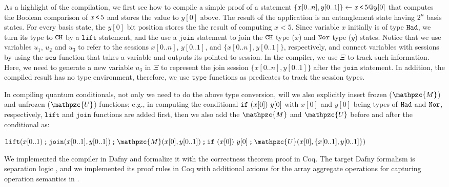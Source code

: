 As a highlight of the compilation, we first see how to compile a simple proof of a statement ${\{x[0..n],y[0..1]\}} \xleftarrow{} {x\,\texttt{<}\,5@y[0]}$ that computes the Boolean comparison of $x\,\texttt{<}\,5$ and stores the value to $y[0]$ above.
The result of the application is an entanglement state having $2^n$ basis states. For every basis state, the $y[0]$ bit position stores the the result of computing $x<5$.
Since variable $x$ initially is of type $\texttt{Had}$, we turn its type to $\texttt{CH}$ by a $\texttt{lift}$ statement, and the use a $\texttt{join}$ statement to join the $\texttt{CH}$ type ($x$) and $\texttt{Nor}$ type ($y$) states.
Notice that we use variables $u_1$, $u_2$ and $u_3$ to refer to the sessions $x[0..n]$, $y[0..1]$, and $\{x[0..n],y[0..1]\}$, respectively, and connect variables with sessions by using the $\texttt{ses}$ function that takes a variable and outputs its pointed-to session. In the \qafny compiler, we use $\Xi$ to track such information. Here, we need to generate a new variable $u_3$ in $\Xi$ to represent the join session $\{x[0..n],y[0..1]\}$ after the $\texttt{join}$ statement. 
In addition, the compiled result has no type environment, therefore, we use $\texttt{type}$ functions as predicates to track the session types.

In compiling quantum conditionals, not only we need to do the above type conversion, will we also explicitly insert frozen ($\mathpzc{M}$) and unfrozen ($\mathpzc{U}$) functions; e.g., in computing the conditional $\texttt{if}~{(x[0])}~{y[0]}$ with $x[0]$ and $y[0]$ being types of $\texttt{Had}$ and $\texttt{Nor}$, respectively, $\texttt{lift}$ and $\texttt{join}$ functions are added first, then we also add the $\mathpzc{M}$ and $\mathpzc{U}$ before and after the conditional as:

{\footnotesize
\begin{center}
${\sseq{\texttt{lift}(x[0..1)}{\sseq{\texttt{join}(x[0..1],y[0..1])}{\sseq{\sseq{\mathpzc{M}(x[0],y[0..1])}{\sifq{x[0]}{y[0]}}}{\mathpzc{U}(x[0],\{x[0..1],y[0..1]\})}}}}$
\end{center}
}

We implemented the compiler in Dafny and formalize it with the correctness theorem proof in Coq. The target Dafny formalism is separation logic \cite{separationlogic}, and we implemented its proof rules in Coq 
with additional axioms for the array aggregate operations for capturing \qafny operation semantics in .

